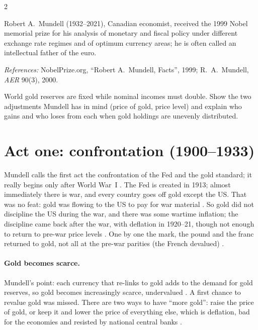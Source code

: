 \begin{paracol}{2}
\begin{history}[Mundell]
Robert A.~Mundell (1932--2021), Canadian economist, received the 1999 Nobel memorial prize for his analysis of monetary and fiscal policy under different
exchange rate regimes and of optimum currency areas; he is often called an intellectual father of the euro.\par
\emph{References:} NobelPrize.org, ``Robert A.~Mundell, Facts'', 1999; R.~A.~Mundell, \emph{AER} 90(3), 2000.
\end{history}

\begin{exercise}
World gold reserves are fixed while nominal incomes must double. Show the two adjustments Mundell has in mind (price of gold, price level) and explain who gains
and who loses from each when gold holdings are unevenly distributed.
\end{exercise}

\section{Act one: confrontation (1900--1933)}\label{sec:intl-act1}

Mundell calls the first act the confrontation of the Fed and the gold standard; it really begins only after World War~I .
The Fed is created in 1913; almost immediately there is war, and every country goes off gold except the US. That was no feat: gold was flowing to the US to pay
for war material . So gold did not discipline the US during the war, and there was some wartime inflation; the discipline came back after the
war, with deflation in 1920--21, though not enough to return to pre-war price levels . One by one the mark,
the pound and the franc returned to gold, not all at the pre-war parities (the French devalued) .

\paragraph{Gold becomes scarce.} Mundell's point: each currency that re-links to gold adds to the demand for gold reserves, so gold becomes increasingly scarce,
undervalued . A first chance to revalue gold was missed. There are two ways to have ``more gold'': raise the price of gold, or keep
it and lower the price of everything else, which is deflation, bad for the economies and resisted by national central banks .


\end{paracol}
